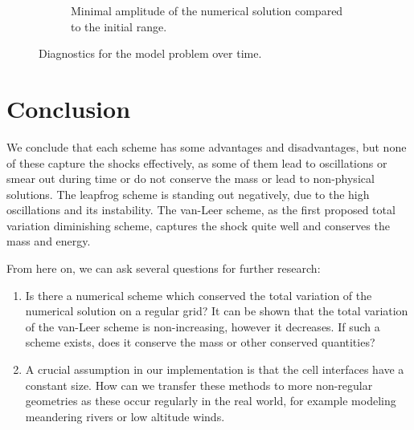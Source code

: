 \begin{figure}[h]
\begin{subfigure}[b]{0.3\textwidth}
        \caption{Minimal amplitude of the numerical solution compared to the initial range.}
        \label{fig:rmix}
    \end{subfigure}

    \caption{Diagnostics for the model problem over time.}
    \label{fig:diagnostics}
\end{figure}






\section{Conclusion}

We conclude that each scheme has some advantages and disadvantages, but none of these capture 
the shocks effectively, as some of them lead to oscillations or smear out during time or do not
conserve the mass or lead to non-physical solutions. The leapfrog scheme is standing out negatively, 
due to the high oscillations and its instability. The van-Leer scheme, as the first proposed
total variation diminishing scheme, captures the shock quite well and conserves the mass and energy.

From here on, we can ask several questions for further research:
\begin{enumerate}
    \item Is there a numerical scheme which conserved the total variation of the numerical
    solution on a regular grid? It can be shown that the total variation of the 
    van-Leer scheme is non-increasing, however it decreases. If such a scheme exists, does
    it conserve the mass or other conserved quantities?

    \item A crucial assumption in our implementation is that the cell interfaces have a constant
    size. How can we transfer these methods to more non-regular geometries as these occur
    regularly in the real world, for example modeling meandering rivers or low altitude winds.
\end{enumerate}
